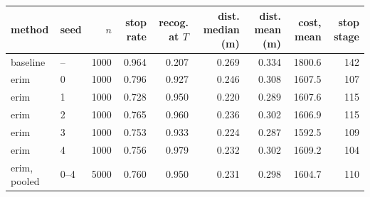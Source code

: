 \begin{tabular}{llrrrrrrr}
\toprule
method & seed & $n$ & stop rate & recog. at $T$ & dist. median (m) & dist. mean (m) & cost, mean & stop stage \\
\midrule
baseline & -- & 1000 & 0.964 & 0.207 & 0.269 & 0.334 & 1800.6 & 142 \\
erim & 0 & 1000 & 0.796 & 0.927 & 0.246 & 0.308 & 1607.5 & 107 \\
erim & 1 & 1000 & 0.728 & 0.950 & 0.220 & 0.289 & 1607.6 & 115 \\
erim & 2 & 1000 & 0.765 & 0.960 & 0.236 & 0.302 & 1606.9 & 115 \\
erim & 3 & 1000 & 0.753 & 0.933 & 0.224 & 0.287 & 1592.5 & 109 \\
erim & 4 & 1000 & 0.756 & 0.979 & 0.232 & 0.302 & 1609.2 & 104 \\
\midrule
erim, pooled & 0--4 & 5000 & 0.760 & 0.950 & 0.231 & 0.298 & 1604.7 & 110 \\
\bottomrule
\end{tabular}